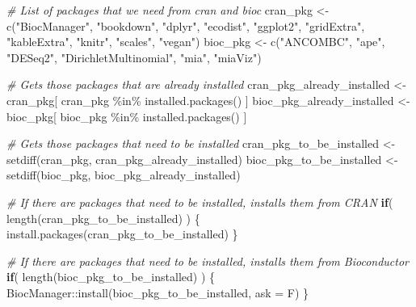 \documentclass[
]{book}
\newenvironment{Shaded}{\begin{snugshade}}{\end{snugshade}}
\newcommand{\AttributeTok}[1]{\textcolor[rgb]{0.77,0.63,0.00}{#1}}
\newcommand{\CommentTok}[1]{\textcolor[rgb]{0.56,0.35,0.01}{\textit{#1}}}
\newcommand{\ControlFlowTok}[1]{\textcolor[rgb]{0.13,0.29,0.53}{\textbf{#1}}}
\newcommand{\FunctionTok}[1]{\textcolor[rgb]{0.00,0.00,0.00}{#1}}
\newcommand{\NormalTok}[1]{#1}
\newcommand{\OtherTok}[1]{\textcolor[rgb]{0.56,0.35,0.01}{#1}}
\newcommand{\SpecialCharTok}[1]{\textcolor[rgb]{0.00,0.00,0.00}{#1}}
\newcommand{\StringTok}[1]{\textcolor[rgb]{0.31,0.60,0.02}{#1}}
\begin{document}
\begin{Shaded}
\begin{Highlighting}[]
\CommentTok{\# List of packages that we need from cran and bioc }
\NormalTok{cran\_pkg }\OtherTok{\textless{}{-}} \FunctionTok{c}\NormalTok{(}\StringTok{"BiocManager"}\NormalTok{, }\StringTok{"bookdown"}\NormalTok{, }\StringTok{"dplyr"}\NormalTok{, }\StringTok{"ecodist"}\NormalTok{, }\StringTok{"ggplot2"}\NormalTok{, }
              \StringTok{"gridExtra"}\NormalTok{, }\StringTok{"kableExtra"}\NormalTok{, }\StringTok{"knitr"}\NormalTok{, }\StringTok{"scales"}\NormalTok{, }\StringTok{"vegan"}\NormalTok{)}
\NormalTok{bioc\_pkg }\OtherTok{\textless{}{-}} \FunctionTok{c}\NormalTok{(}\StringTok{"ANCOMBC"}\NormalTok{, }\StringTok{"ape"}\NormalTok{, }\StringTok{"DESeq2"}\NormalTok{,  }\StringTok{"DirichletMultinomial"}\NormalTok{, }\StringTok{"mia"}\NormalTok{, }\StringTok{"miaViz"}\NormalTok{)}

\CommentTok{\# Gets those packages that are already installed}
\NormalTok{cran\_pkg\_already\_installed }\OtherTok{\textless{}{-}}\NormalTok{ cran\_pkg[ cran\_pkg }\SpecialCharTok{\%in\%} \FunctionTok{installed.packages}\NormalTok{() ]}
\NormalTok{bioc\_pkg\_already\_installed }\OtherTok{\textless{}{-}}\NormalTok{ bioc\_pkg[ bioc\_pkg }\SpecialCharTok{\%in\%} \FunctionTok{installed.packages}\NormalTok{() ]}

\CommentTok{\# Gets those packages that need to be installed}
\NormalTok{cran\_pkg\_to\_be\_installed }\OtherTok{\textless{}{-}} \FunctionTok{setdiff}\NormalTok{(cran\_pkg, cran\_pkg\_already\_installed)}
\NormalTok{bioc\_pkg\_to\_be\_installed }\OtherTok{\textless{}{-}} \FunctionTok{setdiff}\NormalTok{(bioc\_pkg, bioc\_pkg\_already\_installed)}
\end{Highlighting}
\end{Shaded}

\begin{Shaded}
\begin{Highlighting}[]
\CommentTok{\# If there are packages that need to be installed, installs them from CRAN}
\ControlFlowTok{if}\NormalTok{( }\FunctionTok{length}\NormalTok{(cran\_pkg\_to\_be\_installed) ) \{}
   \FunctionTok{install.packages}\NormalTok{(cran\_pkg\_to\_be\_installed)}
\NormalTok{\}}
\end{Highlighting}
\end{Shaded}

\begin{Shaded}
\begin{Highlighting}[]
\CommentTok{\# If there are packages that need to be installed, installs them from Bioconductor}
\ControlFlowTok{if}\NormalTok{( }\FunctionTok{length}\NormalTok{(bioc\_pkg\_to\_be\_installed) ) \{}
\NormalTok{   BiocManager}\SpecialCharTok{::}\FunctionTok{install}\NormalTok{(bioc\_pkg\_to\_be\_installed, }\AttributeTok{ask =}\NormalTok{ F)}
\NormalTok{\}}
\end{Highlighting}
\end{Shaded}
\end{document}
